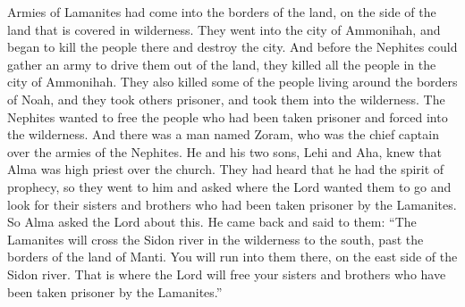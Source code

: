 Armies of Lamanites had come into the borders of the land, on the side of the land that is covered in wilderness. They went into the city of Ammonihah, and began to kill the people there and destroy the city.
\bverse \iffalse And now it came to pass, before the Nephites could raise a sufficient army to drive them out of the land, they had destroyed the people who were in the city of Ammonihah, and also some around the borders of Noah, and taken others captive into the wilderness. \fi
And before the Nephites could gather an army to drive them out of the land, they killed all the people in the city of Ammonihah. They also killed some of the people living around the borders of Noah, and they took others prisoner, and took them into the wilderness.
\bverse \iffalse Now it came to pass that the Nephites were desirous to obtain those who had been carried away captive into the wilderness. \fi
The Nephites wanted to free the people who had been taken prisoner and forced into the wilderness.
\bverse \iffalse Therefore, he that had been appointed chief captain over the armies of the Nephites, (and his name was Zoram, and he had two sons, Lehi and Aha)--now Zoram and his two sons, knowing that Alma was high priest over the church, and having heard that he had the spirit of prophecy, therefore they went unto him and desired of him to know whither the Lord would that they should go into the wilderness in search of their brethren, who had been taken captive by the Lamanites. \fi
And there was a man named Zoram, who was the chief captain over the armies of the Nephites. He and his two sons, Lehi and Aha, knew that Alma was high priest over the church. They had heard that he had the spirit of prophecy, so they went to him and asked where the Lord wanted them to go and look for their sisters and brothers who had been taken prisoner by the Lamanites.
\bverse \iffalse And it came to pass that Alma inquired of the Lord concerning the matter. And Alma returned and said unto them: Behold, the Lamanites will cross the river Sidon in the south wilderness, away up beyond the borders of the land of Manti. And behold there shall ye meet them, on the east of the river Sidon, and there the Lord will deliver unto thee thy brethren who have been taken captive by the Lamanites. \fi
So Alma asked the Lord about this. He came back and said to them: ``The Lamanites will cross the Sidon river in the wilderness to the south, past the borders of the land of Manti. You will run into them there, on the east side of the Sidon river. That is where the Lord will free your sisters and brothers who have been taken prisoner by the Lamanites.''
